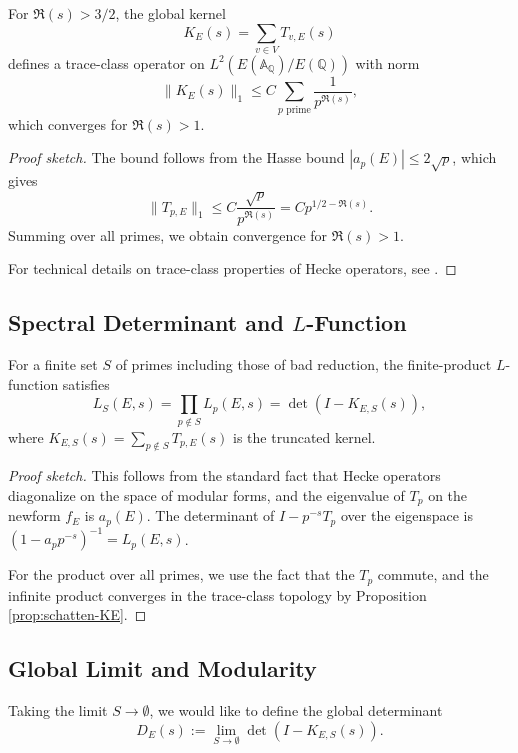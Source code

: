 \begin{proposition}\label{prop:schatten-KE}
For $\Re(s) > 3/2$, the global kernel
\[
K_E(s) = \sum_{v \in V} T_{v,E}(s)
\]
defines a trace-class operator on $L^2(E(\mathbb{A}_{\mathbb{Q}}) / E(\mathbb{Q}))$ with norm
\[
\|K_E(s)\|_1 \leq C \sum_{p \text{ prime}} \frac{1}{p^{\Re(s)}},
\]
which converges for $\Re(s) > 1$.
\end{proposition}

\begin{proof}[Proof sketch]
The bound follows from the Hasse bound $|a_p(E)| \leq 2\sqrt{p}$, which gives
\[
\|T_{p,E}\|_1 \leq C \frac{\sqrt{p}}{p^{\Re(s)}} = C p^{1/2 - \Re(s)}.
\]
Summing over all primes, we obtain convergence for $\Re(s) > 1$.

For technical details on trace-class properties of Hecke operators, see \cite{peller2003}.
\end{proof}

\subsection{Spectral Determinant and $L$-Function}

\begin{theorem}\label{thm:det-L-E}
For a finite set $S$ of primes including those of bad reduction, the finite-product $L$-function satisfies
\[
L_S(E, s) = \prod_{p \notin S} L_p(E, s) = \det(I - K_{E,S}(s)),
\]
where $K_{E,S}(s) = \sum_{p \notin S} T_{p,E}(s)$ is the truncated kernel.
\end{theorem}

\begin{proof}[Proof sketch]
This follows from the standard fact that Hecke operators diagonalize on the space of modular forms, and the eigenvalue of $T_p$ on the newform $f_E$ is $a_p(E)$. The determinant of $I - p^{-s} T_p$ over the eigenspace is $(1 - a_p p^{-s})^{-1} = L_p(E, s)$.

For the product over all primes, we use the fact that the $T_p$ commute, and the infinite product converges in the trace-class topology by Proposition \ref{prop:schatten-KE}.
\end{proof}

\subsection{Global Limit and Modularity}

Taking the limit $S \to \emptyset$, we would like to define the global determinant
\[
D_E(s) := \lim_{S \to \emptyset} \det(I - K_{E,S}(s)).
\]


